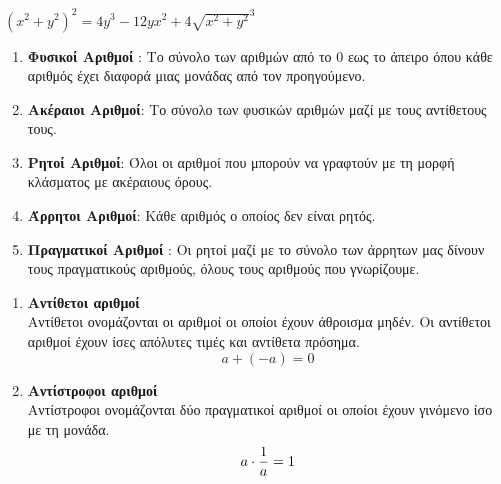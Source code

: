 \documentclass[twoside,nofonts,internet,shmeiwseis]{thewria}
\DeclareRobustCommand{\frac}[3][0pt]{%
{\begingroup\hspace{#1}#2\hspace{#1}\endgroup\over\hspace{#1}#3\hspace{#1}}}
\begin{document}
\clearpage
{}
\begin{center}
$(x^2+y^2)^2=4y^3-12yx^2+4\sqrt{x^2+y^2}^3$\\
\end{center}
\newpage\phantom{}
\clearpage
{}
\orismoi
{}
\vspace{-5mm}
\begin{enumerate}[itemsep=0mm,label=\bf\arabic*.]
\item \textbf{Φυσικοί Αριθμοί} : Το σύνολο των αριθμών από το 0 εως το άπειρο όπου κάθε αριθμός έχει διαφορά μιας μονάδας από τον προηγούμενο.
\item \textbf{Ακέραιοι Αριθμοί}: Το σύνολο των φυσικών αριθμών μαζί με τους αντίθετους τους.
\item \textbf{Ρητοί Αριθμοί}: Όλοι οι αριθμοί που μπορούν να γραφτούν με τη μορφή κλάσματος με ακέραιους όρους.
\item \textbf{Άρρητοι Αριθμοί}: Κάθε αριθμός ο οποίος δεν είναι ρητός.
\item \textbf{Πραγματικοί Αριθμοί} : Οι ρητοί μαζί με το σύνολο των άρρητων μας δίνουν τους πραγματικούς αριθμούς, όλους τους αριθμούς που γνωρίζουμε.
\end{enumerate}
\begin{enumerate}[itemsep=0mm,label=\bf\arabic*.]
\vspace{-5mm}
\item \textbf{Αντίθετοι αριθμοί}\\
Αντίθετοι ονομάζονται οι αριθμοί οι οποίοι έχουν άθροισμα μηδέν. Οι αντίθετοι αριθμοί έχουν ίσες απόλυτες τιμές και αντίθετα πρόσημα.
\[ a+(-a)=0 \]
\item \textbf{Αντίστροφοι αριθμοί}\\
Αντίστροφοι ονομάζονται δύο πραγματικοί αριθμοί οι οποίοι έχουν γινόμενο ίσο με τη μονάδα. \[ a\cdot \frac{1}{a}=1 \]
\end{enumerate}
\end{document}
